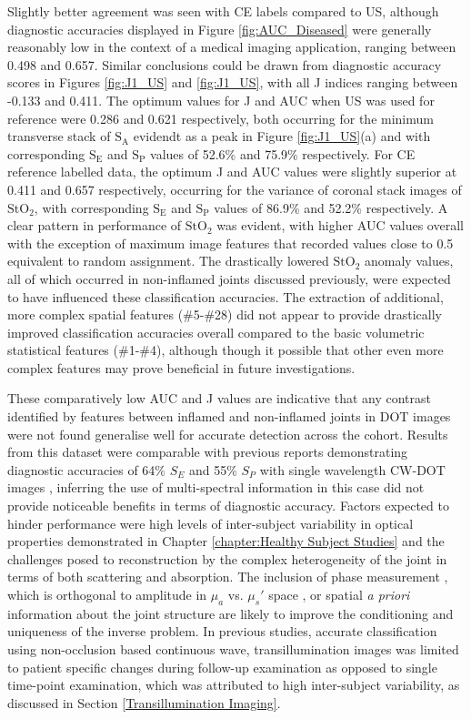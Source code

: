 \documentclass[twoside]{bhamthesis}
\theoremstyle{definition}
\begin{document}
Slightly better agreement was seen with CE labels compared to US, although diagnostic accuracies displayed in Figure \ref{fig:AUC_Diseased} were generally reasonably low in the context of a medical imaging application, ranging between 0.498 and 0.657. Similar conclusions could be drawn from diagnostic accuracy scores in Figures \ref{fig:J1_US} and \ref{fig:J1_US}, with all J indices ranging between -0.133 and 0.411. The optimum values for J and AUC when US was used for reference were 0.286 and 0.621 respectively, both occurring for the minimum transverse stack of $\mathrm{S_A}$ evidendt as a peak in Figure \ref{fig:J1_US}(a) and with corresponding $\mathrm{S_E}$ and $\mathrm{S_P}$ values of 52.6\% and 75.9\% respectively. For CE reference labelled data, the optimum J and AUC values were slightly superior at 0.411 and 0.657 respectively, occurring for the variance of coronal stack images of $\mathrm{StO_2}$, with corresponding $\mathrm{S_E}$ and $\mathrm{S_P}$ values of 86.9\% and 52.2\% respectively. A clear pattern in performance of $\mathrm{StO_2}$ was evident, with higher AUC values overall with the exception of maximum image features that recorded values close to 0.5 equivalent to random assignment. The drastically lowered $\mathrm{StO_2}$ anomaly values, all of which occurred in non-inflamed joints discussed previously, were expected to have influenced these classification accuracies. The extraction of additional, more complex spatial features (\#5-\#28) did not appear to provide drastically improved classification accuracies overall compared to the basic volumetric statistical features (\#1-\#4), although though it possible that other even more complex features may prove beneficial in future investigations. 

These comparatively low AUC and J values are indicative that any contrast identified by features between inflamed and non-inflamed joints in DOT images were not found generalise well for accurate detection across the cohort. Results from this dataset were comparable with previous reports demonstrating diagnostic accuracies of 64\% $S_E$ and 55\% $S_P$ with single wavelength CW-DOT images \cite{hielscher2011frequency}, inferring the use of multi-spectral information in this case did not provide noticeable benefits in terms of diagnostic accuracy. Factors expected to hinder performance were high levels of inter-subject variability in optical properties demonstrated in Chapter 
\ref{chapter:Healthy Subject Studies} and the challenges posed to reconstruction by the complex heterogeneity of the joint in terms of both scattering and absorption. The inclusion of phase measurement \cite{hielscher2011frequency}, which is orthogonal to amplitude in $\mu_a$ vs. $\mu_s'$ space \cite{chu2009image}, or spatial \textit{a priori} information about the joint structure \cite{yuan2010image} are likely to improve the conditioning and uniqueness of the inverse problem. In previous studies, accurate classification using non-occlusion based continuous wave, transillumination images was limited to patient specific changes during follow-up examination as opposed to single time-point examination, which was attributed to high inter-subject variability, as discussed in Section \ref{Transillumination Imaging}. 
 
\end{document}

